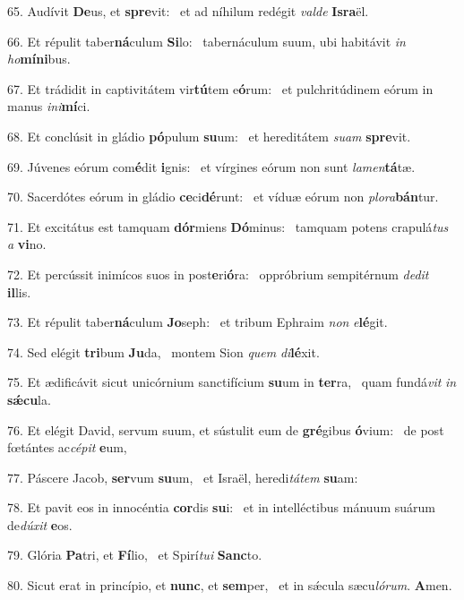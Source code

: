 65. Audívit \textbf{De}us, et \textbf{spre}vit: \ast\  et ad níhilum redégit \textit{val}\textit{de} \textbf{Is}\textbf{ra}ël.\

66. Et répulit taber\textbf{ná}culum \textbf{Si}lo: \ast\  tabernáculum suum, ubi habitávit \textit{in} \textit{ho}\textbf{mí}\textbf{ni}bus.\

67. Et trádidit in captivitátem vir\textbf{tú}tem e\textbf{ó}rum: \ast\  et pulchritúdinem eórum in manus \textit{in}\textit{i}\textbf{mí}ci.\

68. Et conclúsit in gládio \textbf{pó}pulum \textbf{su}um: \ast\  et hereditátem \textit{su}\textit{am} \textbf{spre}vit.\

69. Júvenes eórum com\textbf{é}dit \textbf{i}gnis: \ast\  et vírgines eórum non sunt \textit{la}\textit{men}\textbf{tá}tæ.\

70. Sacerdótes eórum in gládio \textbf{ce}ci\textbf{dé}runt: \ast\  et víduæ eórum non \textit{plo}\textit{ra}\textbf{bán}tur.\

71. Et excitátus est tamquam \textbf{dór}miens \textbf{Dó}minus: \ast\  tamquam potens crapulá\textit{tus} \textit{a} \textbf{vi}no.\

72. Et percússit inimícos suos in post\textbf{e}ri\textbf{ó}ra: \ast\  oppróbrium sempitérnum \textit{de}\textit{dit} \textbf{il}lis.\

73. Et répulit taber\textbf{ná}culum \textbf{Jo}seph: \ast\  et tribum Ephraim \textit{non} \textit{e}\textbf{lé}git.\

74. Sed elégit \textbf{tri}bum \textbf{Ju}da, \ast\  montem Sion \textit{quem} \textit{di}\textbf{lé}xit.\

75. Et ædificávit sicut unicórnium sanctifícium \textbf{su}um in \textbf{ter}ra, \ast\  quam fundá\textit{vit} \textit{in} \textbf{sǽ}\textbf{cu}la.\

76. Et elégit David, servum suum, et sústulit eum de \textbf{gré}gibus \textbf{ó}vium: \ast\  de post fœtántes ac\textit{cé}\textit{pit} \textbf{e}um,\

77. Páscere Jacob, \textbf{ser}vum \textbf{su}um, \ast\  et Israël, heredi\textit{tá}\textit{tem} \textbf{su}am:\

78. Et pavit eos in innocéntia \textbf{cor}dis \textbf{su}i: \ast\  et in intelléctibus mánuum suárum de\textit{dú}\textit{xit} \textbf{e}os.\

79. Glória \textbf{Pa}tri, et \textbf{Fí}lio, \ast\  et Spirí\textit{tu}\textit{i} \textbf{Sanc}to.\

80. Sicut erat in princípio, et \textbf{nunc}, et \textbf{sem}per, \ast\  et in sǽcula sæcu\textit{ló}\textit{rum}. \textbf{A}men.\

